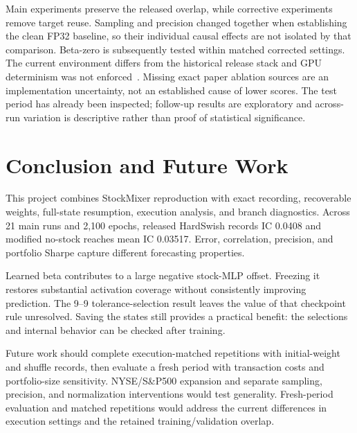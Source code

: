 \documentclass[conference]{IEEEtran}
\begin{document}
Main experiments preserve the released overlap, while corrective experiments remove target reuse. Sampling and precision changed together when establishing the clean FP32 baseline, so their individual causal effects are not isolated by that comparison. Beta-zero is subsequently tested within matched corrected settings. The current environment differs from the historical release stack and GPU determinism was not enforced~\cite{torchrepro}. Missing exact paper ablation sources are an implementation uncertainty, not an established cause of lower scores. The test period has already been inspected; follow-up results are exploratory and across-run variation is descriptive rather than proof of statistical significance.

\section{Conclusion and Future Work}
This project combines StockMixer reproduction with exact recording, recoverable weights, full-state resumption, execution analysis, and branch diagnostics. Across 21 main runs and 2,100 epochs, released HardSwish records IC 0.0408 and modified no-stock reaches mean IC 0.03517. Error, correlation, precision, and portfolio Sharpe capture different forecasting properties.

Learned beta contributes to a large negative stock-MLP offset. Freezing it restores substantial activation coverage without consistently improving prediction. The 9--9 tolerance-selection result leaves the value of that checkpoint rule unresolved. Saving the states still provides a practical benefit: the selections and internal behavior can be checked after training.

Future work should complete execution-matched repetitions with initial-weight and shuffle records, then evaluate a fresh period with transaction costs and portfolio-size sensitivity. NYSE/S\&P500 expansion and separate sampling, precision, and normalization interventions would test generality. Fresh-period evaluation and matched repetitions would address the current differences in execution settings and the retained training/validation overlap.
\end{document}
